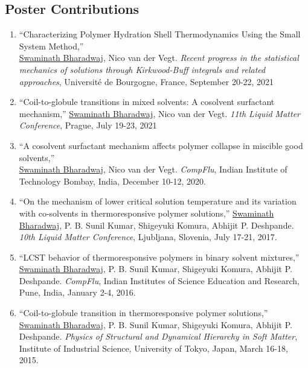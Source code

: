 \documentclass[a4paper,14pt]{article}
\begin{document}
\subsection*{\normalsize Poster Contributions}
\begin{enumerate}
\item
\enquote{Characterizing Polymer Hydration Shell Thermodynamics Using the Small
System Method,}\\  \underline{Swaminath Bharadwaj}, Nico van der Vegt.
\textit{Recent progress in the statistical mechanics of solutions through
Kirkwood-Buff integrals and related approaches}, Universit{\'e} de Bourgogne,
France, September 20-22, 2021
\item
\enquote{Coil-to-globule transitions in mixed solvents: A cosolvent surfactant
mechanism,} \underline{Swaminath Bharadwaj}, Nico van der Vegt. \textit{11th
Liquid Matter Conference}, Prague, July 19-23, 2021
\item
\enquote{A cosolvent surfactant mechanism affects polymer collapse in miscible
good solvents,}\\ \underline{Swaminath Bharadwaj}, Nico van der Vegt.
\textit{CompFlu}, Indian Institute of Technology Bombay, India, December 10-12,
2020.
\item
\enquote{On the mechanism of lower critical solution temperature and its
variation with co-solvents in thermoresponsive polymer
solutions,} \underline{Swaminath Bharadwaj}, P. B. Sunil Kumar, Shigeyuki
Komura, Abhijit P. Deshpande. \textit{10th Liquid Matter Conference}, Ljubljana,
Slovenia, July 17-21, 2017.
\item
\enquote{LCST behavior of thermoresponsive polymers in binary solvent
mixtures,} \underline{Swaminath Bharadwaj}, P. B. Sunil Kumar, Shigeyuki
Komura, Abhijit P. Deshpande. \textit{CompFlu}, Indian Institutes of Science
Education and Research, Pune, India, January 2-4, 2016.
\item
\enquote{Coil-to-globule transition in thermoresponsive polymer solutions,}
\underline{Swaminath Bharadwaj}, P. B. Sunil Kumar, Shigeyuki Komura, Abhijit
P. Deshpande. \textit{Physics of Structural and Dynamical Hierarchy in Soft
Matter}, Institute of Industrial Science, University of Tokyo, Japan, March
16-18, 2015.
\end{enumerate}
\end{document}
